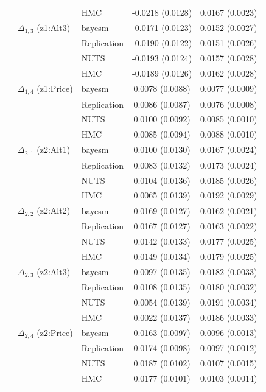 \begin{longtable}{cllcc}
 &  & HMC & -0.0218 (0.0128) & 0.0167 (0.0023) \\
 & $\Delta_{1,3}$ (z1:Alt3) & bayesm & -0.0171 (0.0123) & 0.0152 (0.0027) \\
 &  & Replication & -0.0190 (0.0122) & 0.0151 (0.0026) \\
 &  & NUTS & -0.0193 (0.0124) & 0.0157 (0.0028) \\
 &  & HMC & -0.0189 (0.0126) & 0.0162 (0.0028) \\
 & $\Delta_{1,4}$ (z1:Price) & bayesm & 0.0078 (0.0088) & 0.0077 (0.0009) \\
 &  & Replication & 0.0086 (0.0087) & 0.0076 (0.0008) \\
 &  & NUTS & 0.0100 (0.0092) & 0.0085 (0.0010) \\
 &  & HMC & 0.0085 (0.0094) & 0.0088 (0.0010) \\
 & $\Delta_{2,1}$ (z2:Alt1) & bayesm & 0.0100 (0.0130) & 0.0167 (0.0024) \\
 &  & Replication & 0.0083 (0.0132) & 0.0173 (0.0024) \\
 &  & NUTS & 0.0104 (0.0136) & 0.0185 (0.0026) \\
 &  & HMC & 0.0065 (0.0139) & 0.0192 (0.0029) \\
 & $\Delta_{2,2}$ (z2:Alt2) & bayesm & 0.0169 (0.0127) & 0.0162 (0.0021) \\
 &  & Replication & 0.0167 (0.0127) & 0.0163 (0.0022) \\
 &  & NUTS & 0.0142 (0.0133) & 0.0177 (0.0025) \\
 &  & HMC & 0.0149 (0.0134) & 0.0179 (0.0025) \\
 & $\Delta_{2,3}$ (z2:Alt3) & bayesm & 0.0097 (0.0135) & 0.0182 (0.0033) \\
 &  & Replication & 0.0108 (0.0135) & 0.0180 (0.0032) \\
 &  & NUTS & 0.0054 (0.0139) & 0.0191 (0.0034) \\
 &  & HMC & 0.0022 (0.0137) & 0.0186 (0.0033) \\
 & $\Delta_{2,4}$ (z2:Price) & bayesm & 0.0163 (0.0097) & 0.0096 (0.0013) \\
 &  & Replication & 0.0174 (0.0098) & 0.0097 (0.0012) \\
 &  & NUTS & 0.0187 (0.0102) & 0.0107 (0.0015) \\
 &  & HMC & 0.0177 (0.0101) & 0.0103 (0.0014) \\
\end{longtable}
